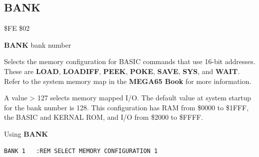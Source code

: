 
\newpage
\subsection{BANK}
\label{bankcommand}
\begin{description}[leftmargin=2cm,style=nextline]
\item [Token:] \$FE \$02
\item [Format:] {\bf BANK} bank number
\item [Usage:] Selects the memory configuration
               for BASIC commands that use 16-bit addresses.
               These are {\bf LOAD}, {\bf LOADIFF}, {\bf PEEK}, {\bf POKE}, {\bf SAVE}, {\bf SYS}, and {\bf WAIT}.
               Refer to the system memory map in
\ifdefined\printmanual
the {\bf MEGA65 Book}
\else
\fi
for more information.
\item [Remarks:] A value > 127 selects memory mapped I/O.
                 The default value at system startup for the bank number is 128.
                 This configuration has RAM from \$0000 to \$1FFF,
                 the BASIC and KERNAL ROM, and I/O from \$2000 to \$FFFF.
\item [Example:] Using {\bf BANK}
\begin{tcolorbox}[colback=black,coltext=white]
\verbatimfont{\codefont}
\begin{verbatim}
BANK 1   :REM SELECT MEMORY CONFIGURATION 1
\end{verbatim}
\end{tcolorbox}
\end{description}


\newpage
